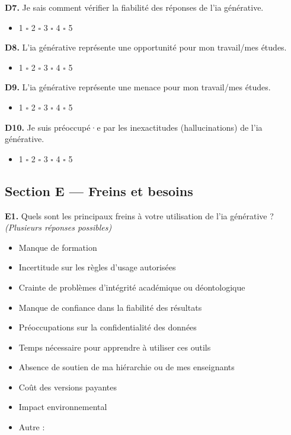 \textbf{D7.} Je sais comment vérifier la fiabilité des réponses de l'\gls{ia} générative.
\begin{itemize}[label=$\square$, leftmargin=1.5cm]
  \item 1 \quad $\square$ 2 \quad $\square$ 3 \quad $\square$ 4 \quad $\square$ 5
\end{itemize}

\textbf{D8.} L'\gls{ia} générative représente une opportunité pour mon travail/mes études.
\begin{itemize}[label=$\square$, leftmargin=1.5cm]
  \item 1 \quad $\square$ 2 \quad $\square$ 3 \quad $\square$ 4 \quad $\square$ 5
\end{itemize}

\textbf{D9.} L'\gls{ia} générative représente une menace pour mon travail/mes études.
\begin{itemize}[label=$\square$, leftmargin=1.5cm]
  \item 1 \quad $\square$ 2 \quad $\square$ 3 \quad $\square$ 4 \quad $\square$ 5
\end{itemize}

\textbf{D10.} Je suis préoccupé·e par les inexactitudes (hallucinations) de l'\gls{ia} générative.
\begin{itemize}[label=$\square$, leftmargin=1.5cm]
  \item 1 \quad $\square$ 2 \quad $\square$ 3 \quad $\square$ 4 \quad $\square$ 5
\end{itemize}

\medskip

\subsection{Section E — Freins et besoins}

\textbf{E1.} Quels sont les principaux freins à votre utilisation de l'\gls{ia} générative ? \textit{(Plusieurs réponses possibles)}
\begin{itemize}[label=$\square$, leftmargin=1.5cm]
  \item Manque de formation
  \item Incertitude sur les règles d'usage autorisées
  \item Crainte de problèmes d'intégrité académique ou déontologique
  \item Manque de confiance dans la fiabilité des résultats
  \item Préoccupations sur la confidentialité des données
  \item Temps nécessaire pour apprendre à utiliser ces outils
  \item Absence de soutien de ma hiérarchie ou de mes enseignants
  \item Coût des versions payantes
  \item Impact environnemental
  \item Autre : \underline{\hspace{4cm}}
\end{itemize}

